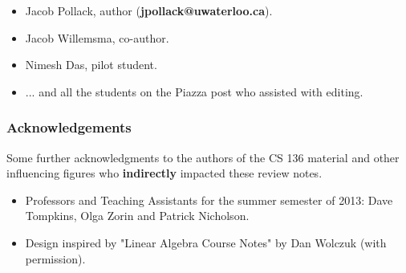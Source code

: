 \begin{itemize}

\item Jacob Pollack, author (\textbf{jpollack@uwaterloo.ca}).
\item Jacob Willemsma, co-author.
\item Nimesh Das, pilot student.
\item ... and all the students on the Piazza post who assisted with editing.

\end{itemize}

\subsubsection*{Acknowledgements}

Some further acknowledgments to the authors of the CS 136 material and other influencing figures who \textbf{indirectly} impacted these review notes.

\begin{itemize}

\item Professors and Teaching Assistants for the summer semester of 2013: Dave Tompkins, Olga Zorin and Patrick Nicholson.
\item Design inspired by "Linear Algebra Course Notes" by Dan Wolczuk (with permission).

\end{itemize}
